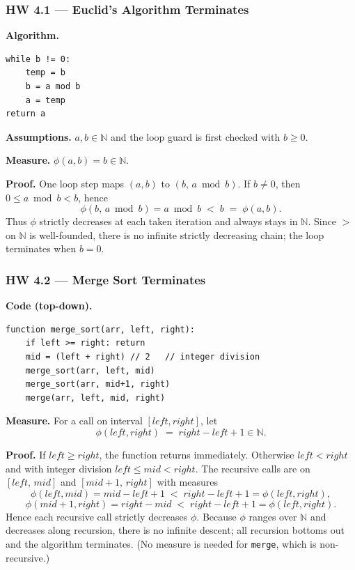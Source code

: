 \documentclass{article}
\theoremstyle{theorem}
\theoremstyle{definition}
\theoremstyle{remark}
\begin{document}
\subsubsection*{HW 4.1 — Euclid’s Algorithm Terminates}
\textbf{Algorithm.}
\begin{verbatim}
while b != 0:
    temp = b
    b = a mod b
    a = temp
return a
\end{verbatim}

\textbf{Assumptions.} \(a,b \in \mathbb{N}\) and the loop guard is first checked with \(b \ge 0\).

\textbf{Measure.} \(\phi(a,b) = b \in \mathbb{N}\).

\textbf{Proof.} One loop step maps \((a,b)\) to \((b,\, a \bmod b)\). If \(b \neq 0\), then \(0 \le a \bmod b < b\), hence
\[
\phi(b,\, a \bmod b) = a \bmod b \;<\; b \;=\; \phi(a,b).
\]
Thus \(\phi\) strictly decreases at each taken iteration and always stays in \(\mathbb{N}\). Since \(>\) on \(\mathbb{N}\) is well-founded, there is no infinite strictly decreasing chain; the loop terminates when \(b=0\).

\subsubsection*{HW 4.2 — Merge Sort Terminates}
\textbf{Code (top-down).}
\begin{verbatim}
function merge_sort(arr, left, right):
    if left >= right: return
    mid = (left + right) // 2   // integer division
    merge_sort(arr, left, mid)
    merge_sort(arr, mid+1, right)
    merge(arr, left, mid, right)
\end{verbatim}

\textbf{Measure.} For a call on interval \([left,right]\), let
\[
\phi(left,right) \;=\; right - left + 1 \in \mathbb{N}.
\]

\textbf{Proof.} If \(left \ge right\), the function returns immediately. Otherwise \(left < right\) and with integer division \(left \le mid < right\). The recursive calls are on \([left,\,mid]\) and \([mid{+}1,\,right]\) with measures
\[
\phi(left,mid) = mid - left + 1 \;<\; right - left + 1 = \phi(left,right),
\]
\[
\phi(mid{+}1,right) = right - mid \;<\; right - left + 1 = \phi(left,right).
\]
Hence each recursive call strictly decreases \(\phi\). Because \(\phi\) ranges over \(\mathbb{N}\) and decreases along recursion, there is no infinite descent; all recursion bottoms out and the algorithm terminates. (No measure is needed for \texttt{merge}, which is non-recursive.)
\end{document}

